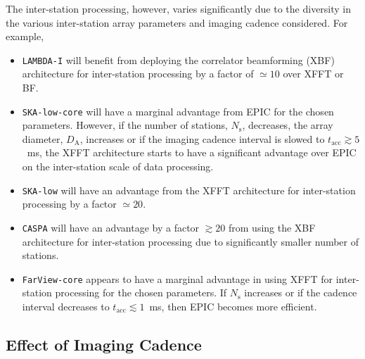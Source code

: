 \documentclass[
  journal=pasa,
  manuscript=article-type,
  year=2020,
  volume=37,
]{cup-journal}
\begin{document}
The inter-station processing, however, varies significantly due to the diversity in the various inter-station array parameters and imaging cadence considered. For example, 
\begin{itemize}
    \item \texttt{LAMBDA-I} will benefit from deploying the correlator beamforming (XBF) architecture for inter-station processing by a factor of $\simeq 10$ over XFFT or BF. 
    \item \texttt{SKA-low-core} will have a marginal advantage from EPIC for the chosen parameters. However, if the number of stations, $N_\textrm{s}$, decreases,  the array diameter, $D_\textrm{A}$, increases or if the imaging cadence interval is slowed to $t_\textrm{acc} \gtrsim 5$~ms, the XFFT architecture starts to have a significant advantage over EPIC on the inter-station scale of data processing. 
    \item \texttt{SKA-low} will have an advantage from the XFFT architecture for inter-station processing by a factor $\simeq 20$.
    \item \texttt{CASPA} will have an advantage by a factor $\gtrsim 20$ from using the XBF architecture for inter-station processing due to significantly smaller number of stations.
    \item \texttt{FarView-core} appears to have a marginal advantage in using XFFT for inter-station processing for the chosen parameters. If $N_\textrm{s}$ increases or if the cadence interval decreases to $t_\textrm{acc}\lesssim 1$~ms, then EPIC becomes more efficient. 
\end{itemize}

\subsection{Effect of Imaging Cadence}\label{sec:cadence}

\end{document}
